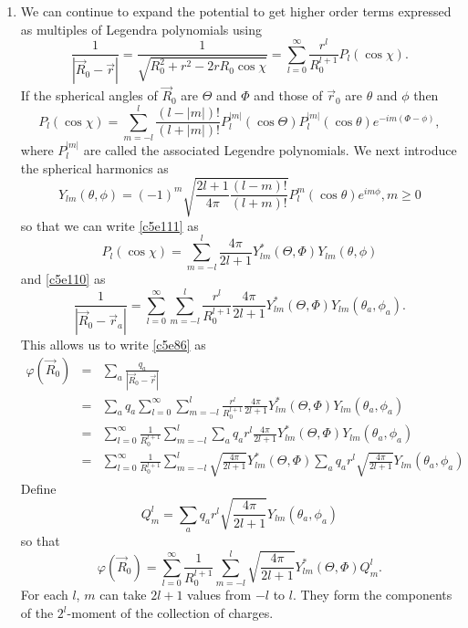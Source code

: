 \begin{enumerate}
\item We can continue to expand the potential to get higher order terms expressed
as multiples of Legendra polynomials using
\begin{equation}\label{c5e110}
\frac{1}{|\vec{R}_0 - \vec{r}|} = \frac{1}{\sqrt{R_0^2 + r^2 - 2rR_0\cos\chi}}
= \sum_{l=0}^\infty \frac{r^l}{R_0^{l+1}}P_l(\cos\chi).
\end{equation}
If the spherical angles of $\vec{R}_0$ are $\Theta$ and $\Phi$ and those of
$\vec{r}_0$ are $\theta$ and $\phi$ then
\begin{equation}\label{c5e111}
P_l(\cos\chi) = \sum_{m=-l}^l\frac{(l -|m|)!}{(l + |m|)!}
P_l^{|m|}(\cos\Theta)P_l^{|m|}(\cos\theta)e^{-im(\Phi-\phi)},
\end{equation}
where $P_l^{|m|}$ are called the associated Legendre polynomials. We next introduce
the spherical harmonics as
\begin{equation}\label{c5e112}
Y_{lm}(\theta,\phi)=(-1)^m\sqrt{\frac{2l+1}{4\pi}\frac{(l-m)!}{(l+m)!}}P_l^m(\cos\theta)e^{im\phi},
m \ge 0
\end{equation}
so that we can write \eqref{c5e111} as
\begin{equation}\label{c5e113}
P_l(\cos\chi)=\sum_{m=-l}^l\frac{4\pi}{2l+1}Y_{lm}^\ast(\Theta,\Phi)Y_{lm}(\theta,\phi)
\end{equation}
and \eqref{c5e110} as
\begin{equation}\label{c5e114}
\frac{1}{|\vec{R}_0 - \vec{r}_a|} = \sum_{l=0}^\infty\sum_{m=-l}^l\frac{r^l}{R_0^{l+1}}
\frac{4\pi}{2l+1}Y_{lm}^\ast(\Theta,\Phi)Y_{lm}(\theta_a,\phi_a).
\end{equation}
This allows us to write \eqref{c5e86} as
\begin{eqnarray*}
\varphi(\vec{R}_0) &=& \sum_a\frac{q_a}{|\vec{R}_0 - \vec{r}|} \\
 &=& \sum_a q_a\sum_{l=0}^\infty\sum_{m=-l}^l\frac{r^l}{R_0^{l+1}}\frac{4\pi}{2l+1}Y_{lm}^\ast(\Theta,\Phi)
     Y_{lm}(\theta_a,\phi_a) \\
 &=& \sum_{l=0}^\infty\frac{1}{R_0^{l+1}}\sum_{m=-l}^l\sum_a q_ar^l\frac{4\pi}{2l+1}Y_{lm}^\ast(\Theta,\Phi)
     Y_{lm}(\theta_a,\phi_a) \\
 &=& \sum_{l=0}^\infty\frac{1}{R_0^{l+1}}\sum_{m=-l}^l\sqrt{\frac{4\pi}{2l+1}}Y_{lm}^\ast(\Theta,\Phi)
     \sum_a q_ar^l\sqrt{\frac{4\pi}{2l+1}}Y_{lm}(\theta_a,\phi_a)
\end{eqnarray*}
Define
\begin{equation}\label{c5e115}
Q_m^l = \sum_a q_ar^l\sqrt{\frac{4\pi}{2l+1}}Y_{lm}(\theta_a,\phi_a)
\end{equation}
so that
\begin{equation}\label{c5e116}
\varphi(\vec{R}_0) = \sum_{l=0}^\infty\frac{1}{R_0^{l+1}}\sum_{m=-l}^l\sqrt{\frac{4\pi}{2l+1}}
Y_{lm}^\ast(\Theta,\Phi)Q_m^l.
\end{equation}
For each $l$, $m$ can take $2l + 1$ values from $-l$ to $l$. They form the 
components of the $2^l$-moment of the collection of charges.


\end{enumerate}
